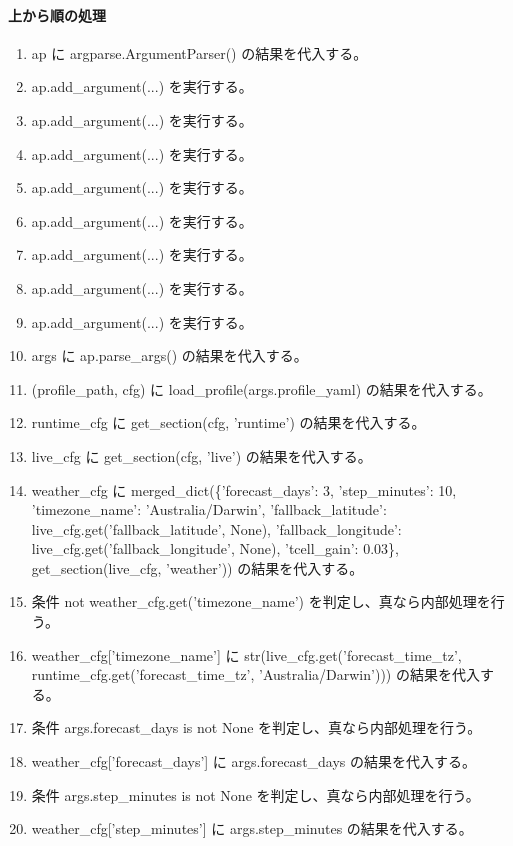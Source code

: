 \documentclass[a4paper,11pt]{article}
\begin{document}
            \paragraph{上から順の処理}
            \begin{enumerate}[leftmargin=1.8em]
            \item ap に argparse.ArgumentParser() の結果を代入する。
\item ap.add\_argument(...) を実行する。
\item ap.add\_argument(...) を実行する。
\item ap.add\_argument(...) を実行する。
\item ap.add\_argument(...) を実行する。
\item ap.add\_argument(...) を実行する。
\item ap.add\_argument(...) を実行する。
\item ap.add\_argument(...) を実行する。
\item ap.add\_argument(...) を実行する。
\item args に ap.parse\_args() の結果を代入する。
\item (profile\_path, cfg) に load\_profile(args.profile\_yaml) の結果を代入する。
\item runtime\_cfg に get\_section(cfg, 'runtime') の結果を代入する。
\item live\_cfg に get\_section(cfg, 'live') の結果を代入する。
\item weather\_cfg に merged\_dict(\{'forecast\_days': 3, 'step\_minutes': 10, 'timezone\_name': 'Australia/Darwin', 'fallback\_latitude': live\_cfg.get('fallback\_latitude', None), 'fallback\_longitude': live\_cfg.get('fallback\_longitude', None), 'tcell\_gain': 0.03\}, get\_section(live\_cfg, 'weather')) の結果を代入する。
\item 条件 not weather\_cfg.get('timezone\_name') を判定し、真なら内部処理を行う。
\item   weather\_cfg['timezone\_name'] に str(live\_cfg.get('forecast\_time\_tz', runtime\_cfg.get('forecast\_time\_tz', 'Australia/Darwin'))) の結果を代入する。
\item 条件 args.forecast\_days is not None を判定し、真なら内部処理を行う。
\item   weather\_cfg['forecast\_days'] に args.forecast\_days の結果を代入する。
\item 条件 args.step\_minutes is not None を判定し、真なら内部処理を行う。
\item   weather\_cfg['step\_minutes'] に args.step\_minutes の結果を代入する。

\end{enumerate}
\end{document}
